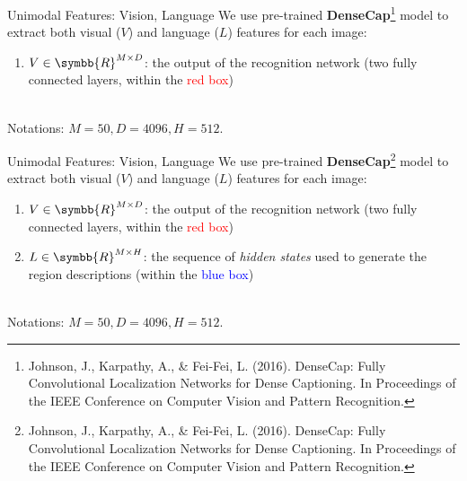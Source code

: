 \documentclass[notes=hide]{beamer}
\newcommand\setR{\symbb{R}}
\begin{document}
\begin{frame}{Unimodal Features: Vision, Language}
\small
We use pre-trained \textbf{DenseCap}\footnote{Johnson, J., Karpathy, A., \& Fei-Fei, L. (2016). DenseCap: Fully Convolutional Localization Networks for Dense Captioning. In Proceedings of the IEEE Conference on Computer Vision and Pattern Recognition.} model to extract both visual ($V$) and language ($L$) features for each image:
\begin{minipage}{1\textwidth}
\vspace{.3cm}
\begin{enumerate}
\item $V \in \setR\sp{M \times D}$: the output of the recognition network (two fully connected layers, within the \textcolor{red}{red box})
\end{enumerate}
\end{minipage} %
\begin{minipage}{0.6\textwidth}
\vspace{.3cm}
\end{minipage}
\vspace{.05cm}\\
Notations: $M=50, D=4096, H=512$.
\end{frame}

\begin{frame}{Unimodal Features: Vision, Language}
\small
We use pre-trained \textbf{DenseCap}\footnote{Johnson, J., Karpathy, A., \& Fei-Fei, L. (2016). DenseCap: Fully Convolutional Localization Networks for Dense Captioning. In Proceedings of the IEEE Conference on Computer Vision and Pattern Recognition.} model to extract both visual ($V$) and language ($L$) features for each image:
\begin{minipage}{1\textwidth}
\vspace{.3cm}
\begin{enumerate}
\item $V \in \setR\sp{M \times D}$: the output of the recognition network (two fully connected layers, within the \textcolor{red}{red box})
\item $L \in \setR\sp{M \times H}$: the sequence of \textit{hidden states} used to generate the region descriptions (within the \textcolor{blue}{blue box})
\end{enumerate}
\end{minipage} %
\begin{minipage}{0.6\textwidth}
\vspace{.3cm}
\end{minipage}
\vspace{.05cm}\\
Notations: $M=50, D=4096, H=512$.
\end{frame}
\end{document}
